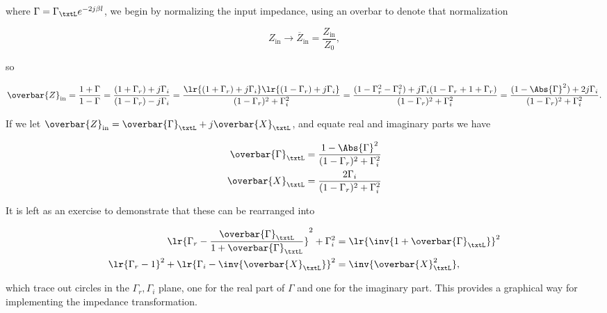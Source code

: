 where \( \Gamma = \Gamma_\txtL e^{- 2 j \beta l } \), we begin by normalizing the input impedance, using an overbar to denote that normalization

\begin{equation}\label{eqn:uwavesDeck5SmithChartCore:380}
Z_{\textrm{in}} \rightarrow \overbar{Z}_{\textrm{in}} = \frac{Z_{\textrm{in}}}{Z_0}, 
\end{equation}

so

\begin{dmath}\label{eqn:uwavesDeck5SmithChartCore:400}
\overbar{Z}_{\textrm{in}} 
= \frac{ 1 + \Gamma }{ 1 - \Gamma }
= \frac{ (1 + \Gamma_r) + j \Gamma_i }{ (1 - \Gamma_r) - j \Gamma_i }
= \frac{ \lr{ (1 + \Gamma_r) + j \Gamma_i}\lr{(1 - \Gamma_r) + j \Gamma_i} }{ (1 - \Gamma_r)^2 + \Gamma_i^2 }
= \frac{ (1 - \Gamma_r^2 - \Gamma_i^2) + j \Gamma_i (1 - \Gamma_r + 1 + \Gamma_r ) }{ (1 - \Gamma_r)^2 + \Gamma_i^2 }
= \frac{ (1 - \Abs{\Gamma}^2) + 2 j \Gamma_i }{ (1 - \Gamma_r)^2 + \Gamma_i^2 }.
\end{dmath}

If we let \( \overbar{Z}_{\textrm{in}} = \overbar{\Gamma}_\txtL + j \overbar{X}_\txtL \), and equate real and imaginary parts we have

\begin{equation}\label{eqn:uwavesDeck5SmithChartCore:420}
\begin{aligned}
\overbar{\Gamma}_\txtL &= \frac{ 1 - \Abs{\Gamma}^2 }{ (1 - \Gamma_r)^2 + \Gamma_i^2 } \\
\overbar{X}_\txtL &= \frac{2 \Gamma_i }{ (1 - \Gamma_r)^2 + \Gamma_i^2 }
\end{aligned}
\end{equation}

It is left as an exercise to demonstrate that these can be rearranged into

\begin{equation}\label{eqn:uwavesDeck5SmithChartCore:440}
\begin{aligned}
\lr{ \Gamma_r - \frac{\overbar{\Gamma}_\txtL}{1 + \overbar{\Gamma}_\txtL } }^2 + \Gamma_i^2 &= \lr{ \inv{1 + \overbar{\Gamma}_\txtL }}^2 \\
\lr{ \Gamma_r - 1 }^2 + \lr{ \Gamma_i - \inv{\overbar{X}_\txtL } }^2 &= \inv{\overbar{X}_\txtL^2},
\end{aligned}
\end{equation}

which trace out circles in the \( \Gamma_r, \Gamma_i \) plane, one for the real part of \( \Gamma \) and one for the imaginary part.  This provides a graphical way for implementing the impedance transformation.  

